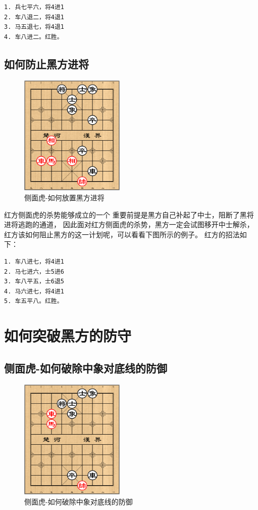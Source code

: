 \documentclass[a5paper,twoside]{book}
\begin{document}
\begin{verbatim}
1. 兵七平六，将4进1
2. 车八退二，将4退1
3. 马五退七，将4退1
4. 车八进二。红胜。
\end{verbatim}

\subsection{如何防止黑方进将}
\label{sec-4-2-2}
\begin{figure}[H]
\centering
\includegraphics[width=5cm]{pic/侧面虎-如何放置黑方进将.png}
\caption{侧面虎-如何放置黑方进将}
\end{figure}

红方侧面虎的杀势能够成立的一个
重要前提是黑方自己补起了中士，阻断了黑将进将逃跑的通道，
因此面对红方侧面虎的杀势，黑方一定会试图移开中士解杀，
红方该如何阻止黑方的这一计划呢，可以看看下图所示的例子。
红方的招法如下：

\begin{verbatim}
1. 车八进七，将4进1
2. 马七进六，士5进6
3. 车八平五，士6退5
4. 马六进七，将4进1
5. 车五平八。红胜。
\end{verbatim}

\section{如何突破黑方的防守}
\label{sec-4-3}
\subsection{侧面虎-如何破除中象对底线的防御}
\label{sec-4-3-1}
\begin{figure}[H]
\centering
\includegraphics[width=5cm]{pic/侧面虎-如何破除中象对底线的防御.png}
\caption{侧面虎-如何破除中象对底线的防御}
\end{figure}
\end{document}

